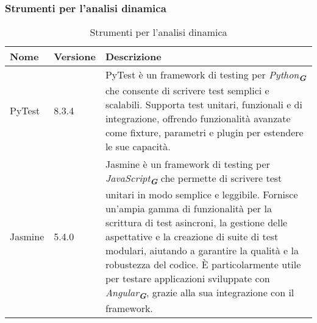 \subsubsection{Strumenti per l’analisi dinamica}
\label{subsec:strumenti_analisi_dinamica}

\begin{table}[h!]
    \centering
    \renewcommand{\arraystretch}{1.6} %
    \begin{tabularx}{\textwidth}{|p{2cm}|p{2cm}|X|} \hline
    \rowcolor[HTML]{FFD700} 
    \textbf{Nome} & \textbf{Versione} & \textbf{Descrizione} \\ \hline
    PyTest & 8.3.4 & PyTest è un framework di testing per \emph{Python}\textsubscript{\textbf{\textit{G}}} che consente di scrivere
                    test semplici e scalabili. 
                    Supporta test unitari, funzionali e di integrazione, offrendo funzionalità avanzate come fixture, parametri e
                    plugin per estendere le sue capacità. \\ \hline
    Jasmine & 5.4.0 & Jasmine è un framework di testing per \emph{JavaScript}\textsubscript{\textbf{\textit{G}}} che permette di
                      scrivere test unitari in modo semplice e leggibile. 
                      Fornisce un'ampia gamma di funzionalità per la scrittura di test asincroni, la gestione delle aspettative e
                      la creazione di suite di test modulari, aiutando a garantire la qualità e la robustezza del codice. 
                      È particolarmente utile per testare applicazioni sviluppate con \emph{Angular}\textsubscript{\textbf{\textit{G}}}, 
                      grazie alla sua integrazione con il framework. \\ \hline
    \end{tabularx}
    \caption{Strumenti per l’analisi dinamica}
\end{table}
